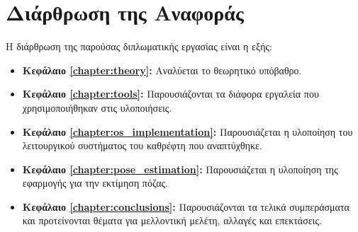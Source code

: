 \section{Διάρθρωση της Αναφοράς}
\label{section:layout}

Η διάρθρωση της παρούσας διπλωματικής εργασίας είναι η εξής:

\begin{itemize}
	\item{\textbf{Κεφάλαιο \ref{chapter:theory}:} Αναλύεται το θεωρητικό υπόβαθρο. 
	}
	\item{\textbf{Κεφάλαιο \ref{chapter:tools}:} Παρουσιάζονται τα διάφορα εργαλεία που χρησιμοποιήθηκαν στις υλοποιήσεις.
	}
	\item{\textbf{Κεφάλαιο \ref{chapter:os_implementation}:} Παρουσιάζεται η υλοποίηση του λειτουργικού συστήματος του καθρέφτη που αναπτύχθηκε.
	}
	\item{\textbf{Κεφάλαιο \ref{chapter:pose_estimation}:} Παρουσιάζεται η υλοποίηση της εφαρμογής για την εκτίμηση πόζας.
	}
	\item{\textbf{Κεφάλαιο \ref{chapter:conclusions}:} Παρουσιάζονται τα τελικά συμπεράσματα και προτείνονται θέματα για μελλοντική μελέτη, αλλαγές και επεκτάσεις.
	}

\end{itemize}

